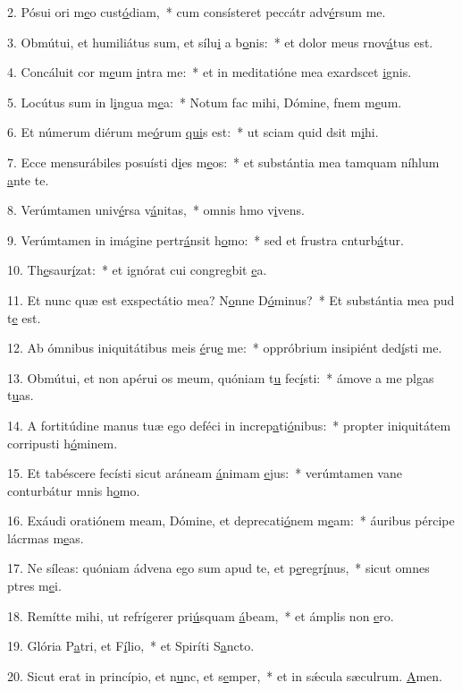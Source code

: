 2. Pósui ori m\uline{e}o cust\uline{ó}diam,~* cum consísteret peccátr adv\uline{é}rsum me.\par 
3. Obmútui, et humiliátus sum, et sílu\uline{i} a b\uline{o}nis:~* et dolor meus rnov\uline{á}tus est.\par 
4. Concáluit cor m\uline{e}um \uline{i}ntra me:~* et in meditatióne mea exardscet \uline{i}gnis.\par 
5. Locútus sum in l\uline{i}ngua m\uline{e}a:~* Notum fac mihi, Dómine, fnem m\uline{e}um.\par 
6. Et númerum diérum me\uline{ó}rum \uline{qui}s est:~* ut sciam quid dsit m\uline{i}hi.\par 
7. Ecce mensurábiles posuísti d\uline{i}es m\uline{e}os:~* et substántia mea tamquam níhlum \uline{a}nte te.\par 
8. Verúmtamen univ\uline{é}rsa v\uline{á}nitas,~* omnis hmo v\uline{i}vens.\par 
9. Verúmtamen in imágine pertr\uline{á}nsit h\uline{o}mo:~* sed et frustra cnturb\uline{á}tur.\par 
10. Th\uline{e}saur\uline{í}zat:~* et ignórat cui congregbit \uline{e}a.\par 
11. Et nunc quæ est exspectátio mea? N\uline{o}nne D\uline{ó}minus?~* Et substántia mea pud t\uline{e} est.\par 
12. Ab ómnibus iniquitátibus meis \uline{é}ru\uline{e} me:~* oppróbrium insipiént ded\uline{í}sti me.\par 
13. Obmútui, et non apérui os meum, quóniam t\uline{u} fec\uline{í}sti:~* ámove a me plgas t\uline{u}as.\par 
14. A fortitúdine manus tuæ ego deféci in increp\uline{a}ti\uline{ó}nibus:~* propter iniquitátem corripusti h\uline{ó}minem.\par 
15. Et tabéscere fecísti sicut aráneam \uline{á}nimam \uline{e}jus:~* verúmtamen vane conturbátur mnis h\uline{o}mo.\par 
16. Exáudi oratiónem meam, Dómine, et deprecati\uline{ó}nem m\uline{e}am:~* áuribus pércipe lácrmas m\uline{e}as.\par 
17. Ne síleas: quóniam ádvena ego sum apud te, et p\uline{e}regr\uline{í}nus,~* sicut omnes ptres m\uline{e}i.\par 
18. Remítte mihi, ut refrígerer pri\uline{ú}squam \uline{á}beam,~* et ámplis non \uline{e}ro.\par 
19. Glória P\uline{a}tri, et F\uline{í}lio,~* et Spiríti S\uline{a}ncto.\par 
20. Sicut erat in princípio, et n\uline{u}nc, et s\uline{e}mper,~* et in sǽcula sæculrum. \uline{A}men.\par 
